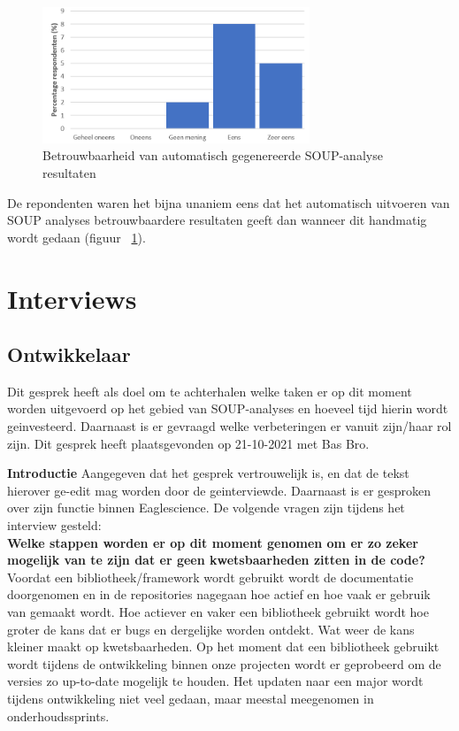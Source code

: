 \begin{figure}[bth]
    \centering
    \includegraphics[width=8cm]{gfx/appendix/Vraag5}
    \caption{Betrouwbaarheid van automatisch gegenereerde SOUP-analyse resultaten }
    \label{fig:enqueteV5}
\end{figure}

De repondenten waren het bijna unaniem eens dat het automatisch uitvoeren van SOUP analyses betrouwbaardere resultaten geeft dan wanneer dit handmatig wordt gedaan (figuur ~\ref{fig:enqueteV5}).

\clearpage
\section{Interviews}\label{sec:interviews}

\subsection{Ontwikkelaar}\label{subsec:ontwikkelaar}
Dit gesprek heeft als doel om te achterhalen welke taken er op dit moment worden uitgevoerd op het gebied van SOUP-analyses en hoeveel tijd hierin wordt geinvesteerd. Daarnaast is er gevraagd welke verbeteringen er vanuit zijn/haar rol zijn. Dit gesprek heeft plaatsgevonden op 21-10-2021 met Bas Bro.\smallskip

\textbf{Introductie }
Aangegeven dat het gesprek vertrouwelijk is, en dat de tekst hierover ge-edit mag worden door de geinterviewde.
Daarnaast is er gesproken over zijn functie binnen Eaglescience.
De volgende vragen zijn tijdens het interview gesteld:
\\
\textbf{Welke stappen worden er op dit moment genomen om er zo zeker mogelijk van te zijn dat er geen kwetsbaarheden zitten in de code? }
Voordat een bibliotheek/framework wordt gebruikt wordt de documentatie doorgenomen en in de repositories nagegaan hoe actief en hoe vaak er gebruik van gemaakt wordt. Hoe actiever en vaker een bibliotheek gebruikt wordt hoe groter de kans dat er bugs en dergelijke worden ontdekt. Wat weer de kans kleiner maakt op kwetsbaarheden. Op het moment dat een bibliotheek gebruikt wordt tijdens de ontwikkeling binnen onze projecten wordt er geprobeerd om de versies zo up-to-date mogelijk te houden. Het updaten naar een major wordt tijdens ontwikkeling niet veel gedaan, maar meestal meegenomen in onderhoudssprints.

